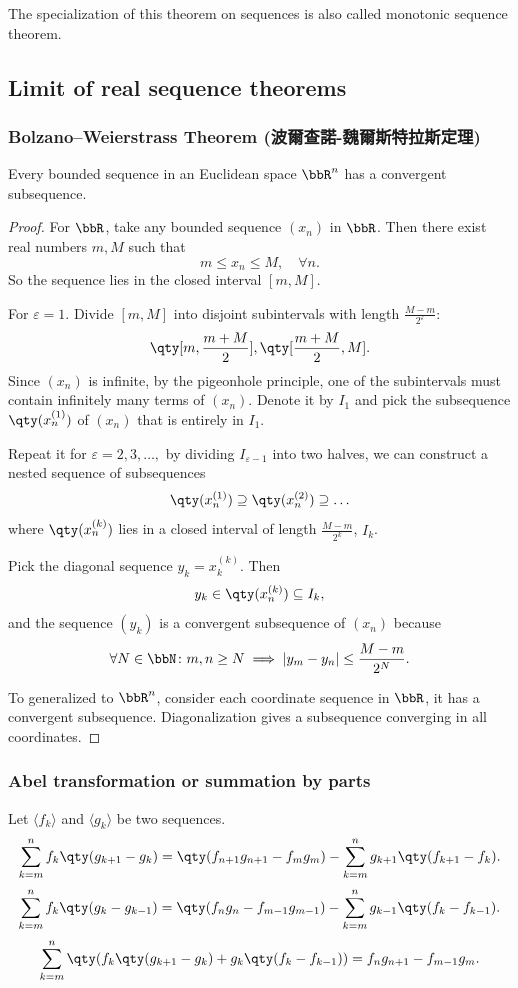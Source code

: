 \documentclass[a4paper,12pt]{report}
\begin{document}
\begin{itemize}
\begin{itemize}
The specialization of this theorem on sequences is also called monotonic sequence theorem.
\subsection{Limit of real sequence theorems}
\subsubsection{Bolzano–Weierstrass Theorem (波爾查諾-魏爾斯特拉斯定理)}
Every bounded sequence in an Euclidean space $\bbR^n$ has a convergent subsequence.

\begin{proof}
    For $\bbR$, take any bounded sequence $(x_n)$ in $\bbR$. Then there exist real numbers $m,M$ such that
    \[m\leq x_n\leq M,\quad\forall n.\]
    So the sequence lies in the closed interval $[m,M]$.

    For $\varepsilon=1$. Divide $[m,M]$ into disjoint subintervals with length $\frac{M-m}{2^\varepsilon}$:
    \[\qty[m,\frac{m+M}{2}],\qty[\frac{m+M}{2},M].\]
    Since $(x_n)$ is infinite, by the pigeonhole principle, one of the subintervals must contain infinitely many terms of $(x_n)$. Denote it by $I_1$ and pick the subsequence $\qty(x_n^{(1)})$ of $(x_n)$ that is entirely in $I_1$.

    Repeat it for $\varepsilon=2,3,\ldots,$ by dividing $I_{\varepsilon-1}$ into two halves, we can construct a nested sequence of subsequences
    \[\qty(x_n^{(1)})\supseteq \qty(x_n^{(2)})\supseteq\ldots\]
    where $\qty(x_n^{(k)})$ lies in a closed interval of length $\frac{M-m}{2^k}$, $I_k$.

    Pick the diagonal sequence $y_k=x_k^{(k)}$. Then
    \[y_k\in\qty(x_n^{(k)})\subseteq I_k,\]
    and the sequence $(y_k)$ is a convergent subsequence of $(x_n)$ because
    \[\forall N\in\bbN\colon m,n\geq N\implies |y_m-y_n|\leq\frac{M-m}{2^N}.\]

    To generalized to $\bbR^n$, consider each coordinate sequence in $\bbR$, it has a convergent subsequence. Diagonalization gives a subsequence converging in all coordinates.
\end{proof}
\subsubsection{Abel transformation or summation by parts}
Let $\langle f_k\rangle$ and $\langle g_k\rangle$ be two sequences.
\[\sum_{k=m}^nf_k\qty(g_{k+1}-g_k)=\qty(f_{n+1}g_{n+1}-f_mg_m)-\sum_{k=m}^ng_{k+1}\qty(f_{k+1}-f_k).\]
\[\sum_{k=m}^nf_k\qty(g_k-g_{k-1})=\qty(f_ng_n-f_{m-1}g_{m-1})-\sum_{k=m}^ng_{k-1}\qty(f_k-f_{k-1}).\]
\[\sum_{k=m}^n\qty(f_k\qty(g_{k+1}-g_k)+g_k\qty(f_k-f_{k-1}))=f_ng_{n+1}-f_{m-1}g_m.\]

\end{itemize}
\end{itemize}
\end{document}
